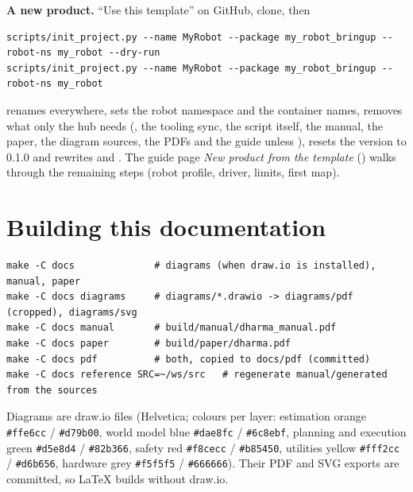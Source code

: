 \textbf{A new product.} ``Use this template'' on GitHub, clone, then
\begin{lstlisting}
scripts/init_project.py --name MyRobot --package my_robot_bringup --robot-ns my_robot --dry-run
scripts/init_project.py --name MyRobot --package my_robot_bringup --robot-ns my_robot
\end{lstlisting}
renames  everywhere, sets the robot namespace and the container names, removes
what only the hub needs (, the tooling sync, the script itself, the manual, the
paper, the diagram sources, the PDFs and the guide unless ), resets the version
to 0.1.0 and rewrites  and . The guide page \emph{New product
from the template} () walks through the remaining steps (robot profile, driver, limits, first map).

\section{Building this documentation}

\begin{lstlisting}
make -C docs              # diagrams (when draw.io is installed), manual, paper
make -C docs diagrams     # diagrams/*.drawio -> diagrams/pdf (cropped), diagrams/svg
make -C docs manual       # build/manual/dharma_manual.pdf
make -C docs paper        # build/paper/dharma.pdf
make -C docs pdf          # both, copied to docs/pdf (committed)
make -C docs reference SRC=~/ws/src   # regenerate manual/generated from the sources
\end{lstlisting}
Diagrams are draw.io files (Helvetica; colours per layer: estimation orange \texttt{\#ffe6cc} /
\texttt{\#d79b00}, world model blue \texttt{\#dae8fc} / \texttt{\#6c8ebf}, planning and execution green
\texttt{\#d5e8d4} / \texttt{\#82b366}, safety red \texttt{\#f8cecc} / \texttt{\#b85450}, utilities yellow
\texttt{\#fff2cc} / \texttt{\#d6b656}, hardware grey \texttt{\#f5f5f5} / \texttt{\#666666}). Their PDF and SVG
exports are committed, so LaTeX builds without draw.io.
